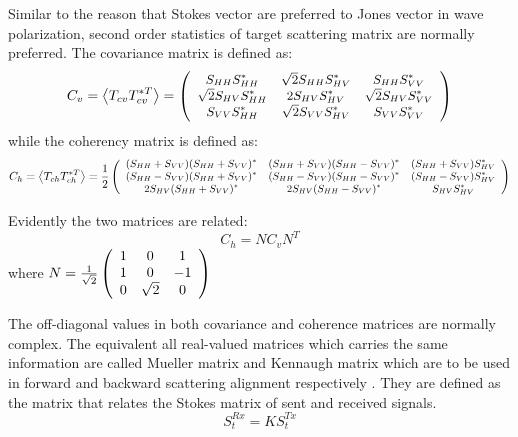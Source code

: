 Similar to the reason that Stokes vector are preferred to Jones vector in wave polarization, 
	second order statistics of target scattering matrix are normally preferred.
The covariance matrix is defined as:
\begin{equation}
\small{
C_v = \left< T_{cv} T_{cv}^{*T} \right> = 
\left( 
\begin{array}{c c c}
 S_{HH}S_{HH}^* 	& \sqrt{2}S_{HH}S_{HV}^*	& S_{HH}S_{VV}^* \\
 \sqrt{2}S_{HV}S_{HH}^* & 2 S_{HV}S_{HV}^* 		& \sqrt{2}S_{HV}S_{VV}^* \\		
 S_{VV}S_{HH}^*		& \sqrt{2}S_{VV}S_{HV}^*	& S_{VV}S_{VV}^*
\end{array}
 \right) 
}
\end{equation}
while the coherency matrix is defined as:
\begin{equation}
\small{
C_h = \left< T_{ch} T_{ch}^{*T} \right> = \frac{1}{2}
\left( 
\begin{array}{c c c}
 (S_{HH}+S_{VV})(S_{HH}+S_{VV})^* 	& (S_{HH}+S_{VV})(S_{HH}-S_{VV})^*	& (S_{HH}+S_{VV})S_{HV}^* \\
 (S_{HH}-S_{VV})(S_{HH}+S_{VV})^* 	& (S_{HH}-S_{VV})(S_{HH}-S_{VV})^* 	& (S_{HH}-S_{VV})S_{HV}^*\\		
 2S_{HV}(S_{HH}+S_{VV})^*		& 2S_{HV}(S_{HH}-S_{VV})^*		& S_{HV}S_{HV}^*
\end{array}
 \right) 
}
\end{equation}

Evidently the two matrices are related:
\begin{equation}
C_h = N C_v N^T
\end{equation}
where
	$N = \frac{1}{\sqrt{2}}
\left( 
\begin{array}{c c c}
 1 & 0		& 1\\
 1 & 0		& -1\\
 0 & \sqrt{2}	& 0
\end{array}
\right)$ 

The off-diagonal values in both covariance and coherence matrices are normally complex. 
The equivalent all real-valued matrices which carries the same information are called Mueller matrix and Kennaugh matrix which are to be used in forward and backward scattering alignment respectively \cite{Guissard_1994_TGRS}. 
They are defined as the matrix that relates the Stokes matrix of sent and received signals.
\begin{equation}
S_t^{Rx} = K S_t^{Tx}
\end{equation}

